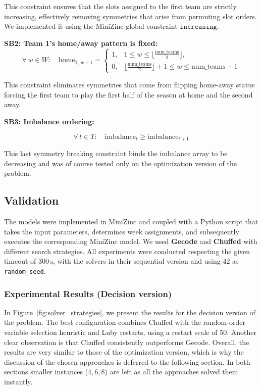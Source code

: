 This constraint ensures that the slots assigned to the first team are strictly increasing, effectively removing symmetries that arise from permuting slot orders. We implemented it using the MiniZinc global constraint $\mathtt{increasing}.$

\textbf{SB2: Team 1's home/away pattern is fixed:}
\[
\forall\, w \in W:\quad
\text{home}_{1,\, w+1} =
\begin{cases}
1, & 1 \le w \le \lfloor \tfrac{\text{num\_teams}}{2} \rfloor,\\[2mm]
0, & \lfloor \tfrac{\text{num\_teams}}{2} \rfloor + 1 \le w \le \text{num\_teams}-1
\end{cases}
\]

This constraint eliminates symmetries that come from flipping home-away status forcing the first team to play the first half of the season at home and the second away.

\textbf{SB3: Imbalance ordering:}  

\[
\forall\, t \in T:\quad \text{imbalance}_t \ge \text{imbalance}_{t+1}
\]

This last symmetry breaking constraint binds the imbalance array to be decreasing and was of course tested only on the optimization version of the problem.

\subsection{Validation}
The models were implemented in MiniZinc and coupled with a Python script that takes the input parameters, determines week assignments, and subsequently executes the corresponding MiniZinc model. We used \textbf{Gecode} and \textbf{Chuffed} with different search strategies. All experiments were conducted respecting the given timeout of $300\,\mathrm{s}$, with the solvers in their sequential version and using $42$ as \texttt{random\_seed}.

\subsubsection{Experimental Results (Decision version)}

In Figure~\ref{fig:solver_strategies}, we present the results for the decision version of the problem. The best configuration combines Chuffed with the random-order variable selection heuristic and Luby restarts, using a restart scale of $50$. Another clear observation is that Chuffed consistently outperforms Gecode. Overall, the results are very similar to those of the optimization version, which is why the discussion of the chosen approaches is deferred to the following section. In both sections smaller instances ($4,6,8$) are left as all the approaches solved them instantly.

